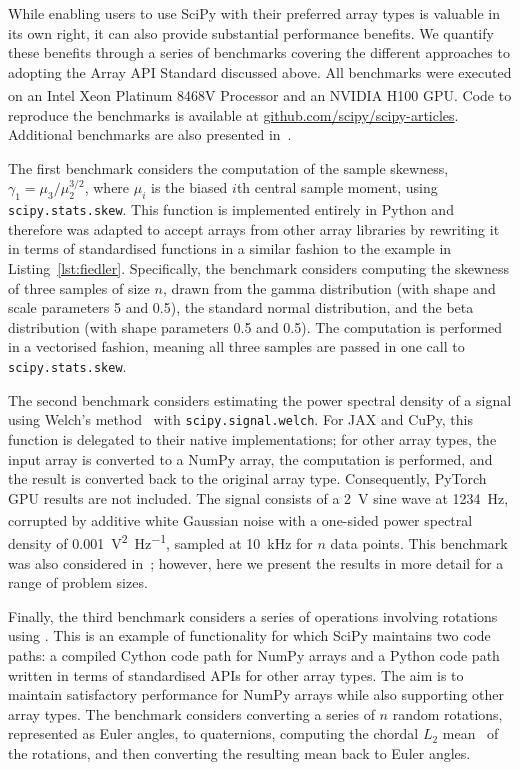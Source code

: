 \documentclass[acmsmall]{acmart}
\begin{document}
While enabling users to use SciPy with their preferred array types is valuable in its
own right, it can also provide substantial performance benefits. We quantify these
benefits through a series of benchmarks covering the different approaches to adopting
the Array API Standard discussed above. All benchmarks
were executed on an Intel\textsuperscript{\textregistered}
Xeon\textsuperscript{\textregistered} Platinum 8468V Processor and
an NVIDIA H100 GPU. Code to reproduce the benchmarks is available at
\href{https://github.com/scipy/scipy-articles}{github.com/scipy/scipy-articles}.
Additional benchmarks are also presented in~\cite{Meurer2023,rotation,rbf_bench}.

The first benchmark considers the computation of the sample skewness,
$\gamma_1 = \mu_3/\mu_2^{3/2}$, where $\mu_i$ is the biased $i$th central sample
moment, using \texttt{scipy.stats.skew}. This function is implemented entirely
in Python and therefore was adapted to accept arrays from other array libraries by
rewriting it in terms of standardised functions in a similar fashion to the example in
Listing~\ref{lst:fiedler}. Specifically, the benchmark considers computing the
skewness of three samples of size $n$, drawn from the gamma distribution (with shape
and scale parameters 5 and 0.5), the standard normal distribution, and the beta
distribution (with shape parameters 0.5 and 0.5). The computation is performed in
a vectorised fashion, meaning all three samples are passed in one call to
\texttt{scipy.stats.skew}.

The second benchmark considers estimating the power spectral density of a signal using
Welch's method~\cite{Welch1967} with \texttt{scipy.signal.welch}. For JAX and CuPy, this
function is delegated to their native implementations; for other array types, the input
array is converted to a NumPy array, the computation is performed, and the result is
converted back to the original array type. Consequently, PyTorch GPU results are not
included. The signal consists of a \SI{2}{\volt_{}} sine wave at
\SI{1234}{\hertz}, corrupted by additive white Gaussian noise with a one-sided power
spectral density of \SI{0.001}{\volt\squared\per\hertz}, sampled at \SI{10}{\kilo\hertz}
for $n$ data points. This benchmark was also considered in~\cite{Meurer2023}; however,
here we present the results in more detail for a range of problem sizes.

Finally, the third benchmark considers a series of operations involving rotations using
. This is an example of functionality for which
SciPy maintains two code paths: a compiled Cython code path for NumPy arrays and a
Python code path written in terms of standardised APIs for other array types. The aim is
to maintain satisfactory performance for NumPy arrays while also supporting other array
types. The benchmark considers converting a series of $n$ random rotations, represented
as Euler angles, to quaternions, computing the chordal $L_2$ mean~\cite{Hartley2013} of
the rotations, and then converting the resulting mean back to Euler angles.
\end{document}
